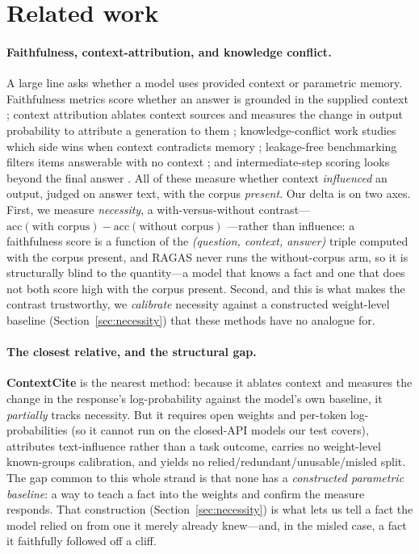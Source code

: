 \documentclass{article}
\begin{document}
\section{Related work}
\label{sec:related}
\paragraph{Faithfulness, context-attribution, and knowledge conflict.} A large line asks whether a
model uses provided context or parametric memory. Faithfulness metrics score whether an answer is
grounded in the supplied context \citep{ragas2023}; context attribution ablates context sources and
measures the change in output probability to attribute a generation to them \citep{contextcite2024,
priordominance2026}; knowledge-conflict work studies which side wins when context contradicts memory
\citep{knowledgeconflicts2024, faithfulrag2025}; leakage-free benchmarking filters items answerable
with no context \citep{seedrg2026}; and intermediate-step scoring looks beyond the final answer
\citep{cuer2026}. All of these measure whether context \emph{influenced} an output, judged on answer
text, with the corpus \emph{present}. Our delta is on two axes. First, we measure \emph{necessity}, a
with-versus-without contrast---$\mathrm{acc}(\text{with corpus})-\mathrm{acc}(\text{without corpus})$
---rather than influence: a faithfulness score is a function of the \emph{(question, context, answer)}
triple computed with the corpus present, and RAGAS never runs the without-corpus arm, so it is
structurally blind to the quantity---a model that knows a fact and one that does not both score high
with the corpus present. Second, and this is what makes the contrast trustworthy, we \emph{calibrate}
necessity against a constructed weight-level baseline (Section~\ref{sec:necessity}) that these methods
have no analogue for.

\paragraph{The closest relative, and the structural gap.} \textbf{ContextCite} \citep{contextcite2024}
is the nearest method: because it ablates context and measures the change in the response's
log-probability against the model's own baseline, it \emph{partially} tracks necessity. But it requires
open weights and per-token log-probabilities (so it cannot run on the closed-API models our test
covers), attributes text-influence rather than a task outcome, carries no weight-level known-groups
calibration, and yields no relied/redundant/unusable/misled split. The gap common to this whole
strand is that none has a \emph{constructed parametric baseline}: a way to teach a fact into the
weights and confirm the measure responds. That construction (Section~\ref{sec:necessity}) is what lets
us tell a fact the model relied on from one it merely already knew---and, in the misled case, a fact it
faithfully followed off a cliff.
\end{document}
